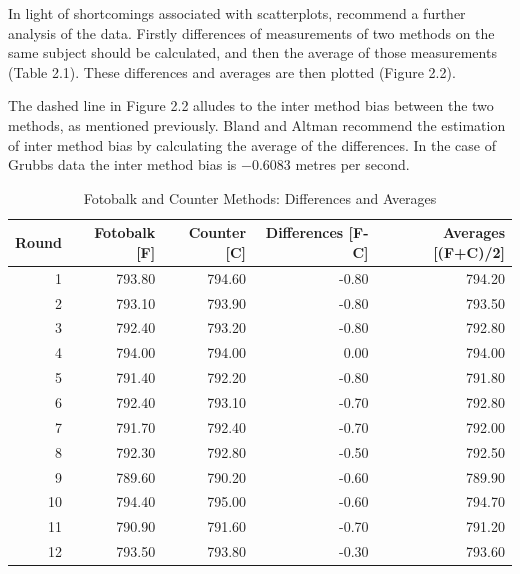 \documentclass[12pt, a4paper]{report}
\begin{document}
	In light of shortcomings associated with scatterplots,
	\citet*{BA83} recommend a further analysis of the data. Firstly
	differences of measurements of two methods on the same subject
	should  be calculated, and then the average of those measurements
	(Table 2.1). These differences and averages are then plotted
	(Figure 2.2).
	
	
	
	
	The dashed line in Figure 2.2 alludes to the inter method bias
	between the two methods, as mentioned previously. Bland and Altman
	recommend the estimation of inter method bias by calculating the
	average of the differences. In the case of Grubbs data the inter
	method bias is $-0.6083$ metres per second.
	\newpage
	
	\begin{table}[tbh]
		\begin{center}
			
			\begin{tabular}{rrrrr}
				\hline
				Round & Fotobalk [F] & Counter [C] & Differences [F-C] & Averages [(F+C)/2] \\
				\hline
				1 & 793.80 & 794.60 & -0.80 & 794.20 \\
				2 & 793.10 & 793.90 & -0.80 & 793.50 \\
				3 & 792.40 & 793.20 & -0.80 & 792.80 \\
				4 & 794.00 & 794.00 & 0.00 & 794.00 \\
				5 & 791.40 & 792.20 & -0.80 & 791.80 \\
				6 & 792.40 & 793.10 & -0.70 & 792.80 \\
				7 & 791.70 & 792.40 & -0.70 & 792.00 \\
				8 & 792.30 & 792.80 & -0.50 & 792.50 \\
				9 & 789.60 & 790.20 & -0.60 & 789.90 \\
				10 & 794.40 & 795.00 & -0.60 & 794.70 \\
				11 & 790.90 & 791.60 & -0.70 & 791.20 \\
				12 & 793.50 & 793.80 & -0.30 & 793.60 \\
				\hline
			\end{tabular}
			\caption{Fotobalk and Counter Methods: Differences and Averages}
		\end{center}
	\end{table}
	
\end{document}
